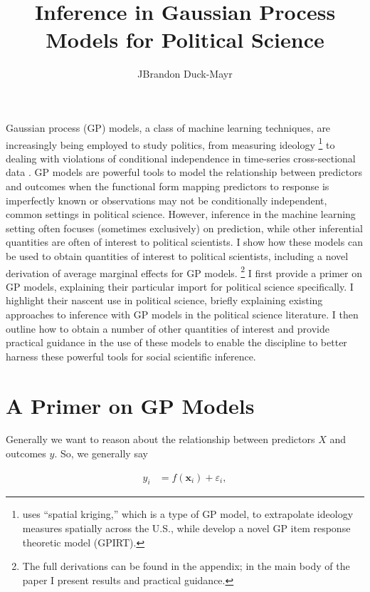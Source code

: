 \documentclass{draft}
\title{Inference in Gaussian Process Models for Political Science}
\author{JBrandon Duck-Mayr}
\date{}
\begin{document}
\maketitlepage

Gaussian process (GP) models, a class of machine learning techniques, are increasingly being employed to study politics,
from measuring ideology \citep{Gill2020Measuring, Duck-MayrEtAl2020GPIRT}%
\footnote{
    \citet{Gill2020Measuring} uses ``spatial kriging,'' which is a type of GP model,
    to extrapolate ideology measures spatially across the U.S.,
    while \citet{Duck-MayrEtAl2020GPIRT} develop a novel GP item response theoretic model (GPIRT).
}
to dealing with violations of conditional independence in time-series cross-sectional data \citep{Carlson2020Modeling}.
GP models are powerful tools to model the relationship between predictors and outcomes when
the functional form mapping predictors to response is imperfectly known or observations may not be conditionally independent,
common settings in political science.
However, inference in the machine learning setting often focuses (sometimes exclusively) on prediction,
while other inferential quantities are often of interest to political scientists.
I show how these models can be used to obtain quantities of interest to political scientists,
including a novel derivation of average marginal effects for GP models.%
\footnote{
    The full derivations can be found in the appendix;
    in the main body of the paper I present results and practical guidance.
}
I first provide a primer on GP models, explaining their particular import for political science specifically.
I highlight their nascent use in political science,
briefly explaining existing approaches to inference with GP models in the political science literature.
I then outline how to obtain a number of other quantities of interest and provide practical guidance in the use of these models
to enable the discipline to better harness these powerful tools for social scientific inference.


\section{A Primer on GP Models}
\label{sec:gp-primer}

Generally we want to reason about the relationship between predictors \( X \) and outcomes \( y \).
So, we generally say

\vspace*{-\baselineskip}
\begin{align}
    y_i & = f \left( \mathbf{x}_i \right) + \varepsilon_i,
\end{align}
\end{document}
